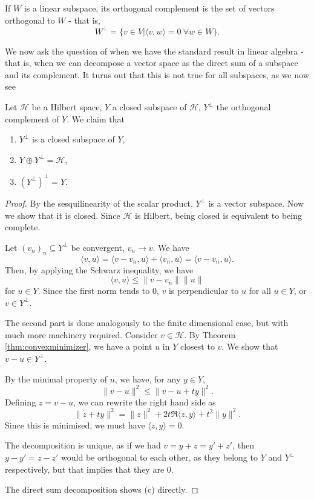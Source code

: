 \documentclass[twoside,symmetric, openany, 12pt]{./tuftebook}
\theoremstyle{definition}
\theoremstyle{definition}
\theoremstyle{definition}
\newenvironment{parts}{\begin{enumerate}[label=(\alph*)]}{\end{enumerate}}
\begin{document}
\begin{Definition}
	If $W$ is a linear subspace, its orthogonal complement is the set of vectors orthogonal to $W$ - that is,
	\[W^\perp = \{v\in V | \langle v, w\rangle = 0~\forall w\in W\}.\]
\end{Definition}
We now ask the question of when we have the standard result in linear algebra - that is, when we can decompose a vector space as the direct sum of a subspace and its complement. It turns out that this is not true for all subspaces, as we now see
\begin{Theorem}
	Let $\mathcal{H}$ be a Hilbert space, $Y$ a closed subspace of $\mathcal{H}$, $Y^\perp$ the orthogonal complement of $Y$. We claim that
	\begin{parts}
	\item $Y^\perp$ is a closed subspace of $Y$,
	\item $Y\oplus Y^\perp = \mathcal{H}$, 
	\item $(Y^\perp)^\perp = Y$.
	\end{parts}
\end{Theorem}
\begin{proof}
	By the sesquilinearity of the scalar product, $Y^\perp$ is a vector subspace. Now we show that it is closed. Since $\mathcal{H}$ is Hilbert, being closed is equivalent to being complete.

	Let $(v_n)_n\subseteq Y^\perp$ be convergent, $v_n\to v$. We have
	\[
	\langle v, u\rangle = \langle v - v_n, u\rangle + \langle v_n, u\rangle = \langle v - v_n, u\rangle
	.\] 
	Then, by applying the Schwarz inequality, we have
	\[
	\langle v, u \rangle \le \|v - v_n\|\|u\|
	\]
	for $u\in Y$. Since the first norm tends to $0$, $v$ is perpendicular to $u$ for all $u\in Y$, or $v\in Y^\perp$. 

	The second part is done analogously to the finite dimensional case, but with much more machinery required. Consider $v\in \mathcal{H}$. By Theorem \ref{thm:convexminimizer}, we have a point $u$ in $Y$ closest to $v$. We show that $v-u\in Y^\perp$.  

	By the minimal property of $u$, we have, for any $y\in Y$,
	\[
	\|v - u\|^2 \le \|v - u + ty\|^2
	.\] 
	Defining $z=v-u$, we can rewrite the right hand side as
	\[
	\|z + ty\|^2= \|z\|^2 + 2t \Re \langle z, y\rangle + t^2 \|y\|^2
	.\] 
	Since this is minimised, we must have $\langle z, y\rangle = 0$.

	The decomposition is unique, as if we had $v = y + z = y' + z'$, then $y-y'=z-z'$ would be orthogonal to each other, as they belong to $Y$ and $Y^\perp$ respectively, but that implies that they are 0.

	The direct sum decomposition shows (c) directly.
\end{proof}
\end{document}
